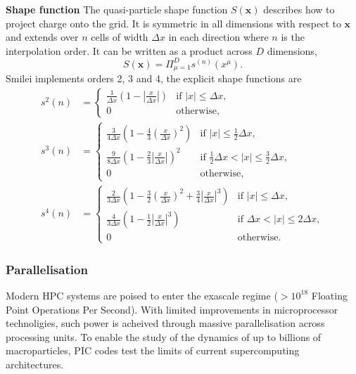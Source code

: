 \textbf{Shape function} The quasi-particle shape function $S(\mathbf{x})$ describes how to project charge onto the grid. It is symmetric in all dimensions with respect to $\mathbf{x}$ and extends over $n$ cells of width $\Delta x$ in each direction where $n$ is the interpolation order. It can be written as a product across $D$ dimensions,
\begin{equation}
	S(\mathbf{x}) = \Pi^D_{\mu = 1}s^{(n)}(x^\mu).
\end{equation}
Smilei implements orders 2, 3 and 4, the explicit shape functions are
\begin{subequations}
	\begin{align}
	s^2 (n) &= \begin{cases}
		\frac{1}{\Delta x}\left(1-\left|\frac{x}{\Delta x}\right| \right)  & \text{if } |x| \le \Delta x, \\
		0  & \text{otherwise,}
	\end{cases} \\
	s^3(n) &= \begin{cases}
		\frac{3}{4\Delta x}\left(1-\frac{4}{3}\left(\frac{x}{\Delta x}\right)^2 \right)  & \text{if } |x| \le \frac{1}{2}\Delta x, \\
		\frac{9}{8\Delta x}\left(1-\frac{2}{3}\left|\frac{x}{\Delta x}\right| \right)^2  & \text{if } \frac{1}{2}\Delta x <|x| \le \frac{3}{2} \Delta x, \\
		0  & \text{otherwise,}
	\end{cases}  \\
		s^4(n) &= \begin{cases}
		\frac{2}{3 \Delta x}\left( 1-\frac{3}{2}\left(\frac{x}{\Delta x}\right)^2 + \frac{3}{4}\left| \frac{x}{\Delta x}\right| ^3 \right)  & \text{if } |x| \le \Delta x, \\
		\frac{4}{3 \Delta x}\left(1-\frac{1}{2}\left|\frac{x}{\Delta x}\right| ^3 \right)  & \text{if } \Delta x <|x| \le 2\Delta x, \\
		0  & \text{otherwise.}
	\end{cases} 
	\end{align}
\end{subequations}

\subsubsection{Parallelisation}
Modern \ac{HPC} systems are poised to enter the exascale regime ($> 10^{18}$ Floating Point Operations Per Second). With limited improvements in microprocessor technoligies, such power is acheived through massive parallelisation across processing units. To enable the study of the dynamics of up to billions of macroparticles, PIC codes test the limits of current supercomputing architectures. 

